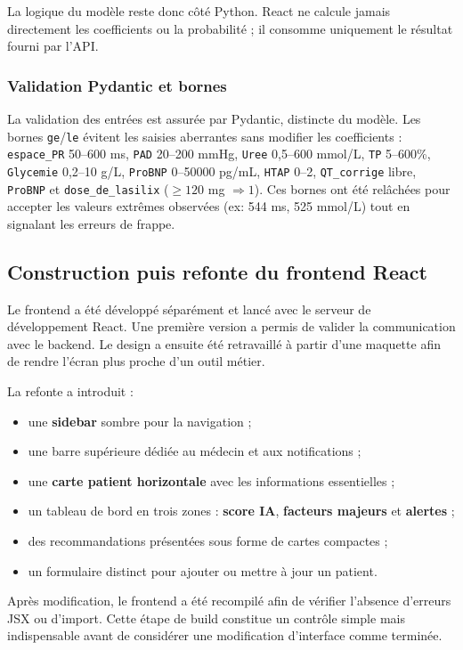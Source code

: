 \documentclass[12pt,a4paper]{report}
\begin{document}
La logique du modèle reste donc côté Python. React ne calcule jamais directement les
coefficients ou la probabilité ; il consomme uniquement le résultat fourni par l'API.

\subsubsection{Validation Pydantic et bornes}
La validation des entrées est assurée par Pydantic, distincte du modèle. Les bornes \texttt{ge}/\texttt{le} évitent les saisies aberrantes sans modifier les coefficients :
\texttt{espace\_PR} 50--600 ms, \texttt{PAD} 20--200 mmHg, \texttt{Uree} 0,5--600 mmol/L, \texttt{TP} 5--600\%, \texttt{Glycemie} 0,2--10 g/L, \texttt{ProBNP} 0--50000 pg/mL, \texttt{HTAP} 0--2, \texttt{QT\_corrige} libre, \texttt{ProBNP} et \texttt{dose\_de\_lasilix} ($\geq120$ mg $\Rightarrow1$). Ces bornes ont été relâchées pour accepter les valeurs extrêmes observées (ex: 544 ms, 525 mmol/L) tout en signalant les erreurs de frappe.

\subsection{Construction puis refonte du frontend React}

Le frontend a été développé séparément et lancé avec le serveur de développement React.
Une première version a permis de valider la communication avec le backend. Le design a
ensuite été retravaillé à partir d'une maquette afin de rendre l'écran plus proche d'un
outil métier.

La refonte a introduit :
\begin{itemize}[leftmargin=1.5em]
 \item une \textbf{sidebar} sombre pour la navigation ;
 \item une barre supérieure dédiée au médecin et aux notifications ;
 \item une \textbf{carte patient horizontale} avec les informations essentielles ;
 \item un tableau de bord en trois zones : \textbf{score IA}, \textbf{facteurs majeurs}
 et \textbf{alertes} ;
 \item des recommandations présentées sous forme de cartes compactes ;
 \item un formulaire distinct pour ajouter ou mettre à jour un patient.
\end{itemize}
Après modification, le frontend a été recompilé afin de vérifier l'absence d'erreurs JSX ou
d'import. Cette étape de build constitue un contrôle simple mais indispensable avant de
considérer une modification d'interface comme terminée.
\end{document}
